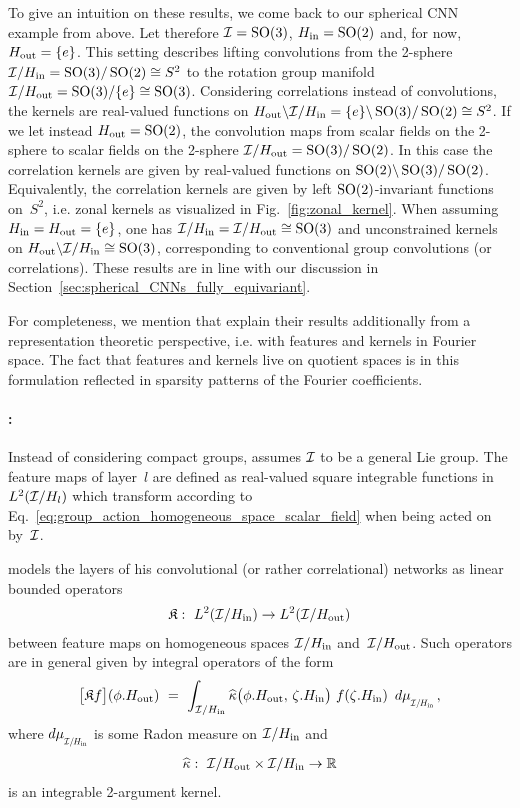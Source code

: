 To give an intuition on these results, we come back to our spherical CNN example from above.
Let therefore $\mathcal{I}=\operatorname{SO}(3)$, $H_{\textup{in}}=\operatorname{SO}(2)$ and, for now, $H_{\textup{out}}=\{e\}$.
This setting describes lifting convolutions from the 2-sphere $\mathcal{I}/H_{\textup{in}} = \operatorname{SO}(3)/\operatorname{SO}(2) \cong S^2$ to the rotation group manifold $\mathcal{I}/H_{\textup{out}} = \operatorname{SO}(3)/\{e\} \cong \operatorname{SO}(3)$.
Considering correlations instead of convolutions, the kernels are real-valued functions on $H_{\textup{out}}\backslash \mathcal{I}/H_{\textup{in}} = \{e\}\backslash \operatorname{SO}(3)/\operatorname{SO}(2) \cong S^2$.
If we let instead $H_{\textup{out}}=\operatorname{SO}(2)$, the convolution maps from scalar fields on the 2-sphere to scalar fields on the 2-sphere $\mathcal{I}/H_{\textup{out}} = \operatorname{SO}(3)/\operatorname{SO}(2)$.
In this case the correlation kernels are given by real-valued functions on $\operatorname{SO}(2)\backslash \operatorname{SO}(3)/\operatorname{SO}(2)$.
Equivalently, the correlation kernels are given by left $\operatorname{SO}(2)$-invariant functions on~$S^2$, i.e. zonal kernels as visualized in Fig.~\ref{fig:zonal_kernel}.
When assuming $H_{\textup{in}}=H_{\textup{out}}=\{e\}$, one has $\mathcal{I}/H_{\textup{in}} = \mathcal{I}/H_{\textup{out}} \cong \operatorname{SO}(3)$ and unconstrained kernels on $H_{\textup{out}}\backslash \mathcal{I}/H_{\textup{in}} \cong \operatorname{SO}(3)$, corresponding to conventional group convolutions (or correlations).
These results are in line with our discussion in Section~\ref{sec:spherical_CNNs_fully_equivariant}.


For completeness, we mention that \citet{Kondor2018-GENERAL} explain their results additionally from a representation theoretic perspective, i.e. with features and kernels in Fourier space.
The fact that features and kernels live on quotient spaces is in this formulation reflected in sparsity patterns of the Fourier coefficients.








\paragraph{\citet{bekkers2020bspline} :}

Instead of considering compact groups, \citet{bekkers2020bspline} assumes $\mathcal{I}$ to be a general Lie group.
The feature maps of layer~$l$ are defined as real-valued square integrable functions in $L^2(\mathcal{I}/H_l)$
which transform according to Eq.~\eqref{eq:group_action_homogeneous_space_scalar_field} when being acted on by~$\mathcal{I}$.

\citet{bekkers2020bspline} models the layers of his convolutional (or rather correlational) networks as linear bounded operators
\begin{align}
    \mathfrak{K}:\ L^2(\mathcal{I}/H_{\textup{in}}) \to L^2(\mathcal{I}/H_{\textup{out}})
\end{align}
between feature maps on homogeneous spaces $\mathcal{I}/H_{\textup{in}}$ and~$\mathcal{I}/H_{\textup{out}}$.
Such operators are in general given by integral operators of the form
\begin{align}
    \big[\mathfrak{K}f\big] (\phi.\Hout)\ =\ 
    \int_{\I/\Hin} \widehat{\kappa} \big(\phi.\Hout,\, \zeta.\Hin \big)\ f(\zeta.\Hin)\,\ \dmuIHin \,,
\end{align}
where $\dmuIHin$ is some Radon measure on $\mathcal{I}/H_{\textup{in}}$ and
\begin{align}
    \widehat{\kappa}:\ \mathcal{I}/H_{\textup{out}} \times \mathcal{I}/H_{\textup{in}} \to \mathbb{R}
\end{align}
is an integrable 2-argument kernel.

